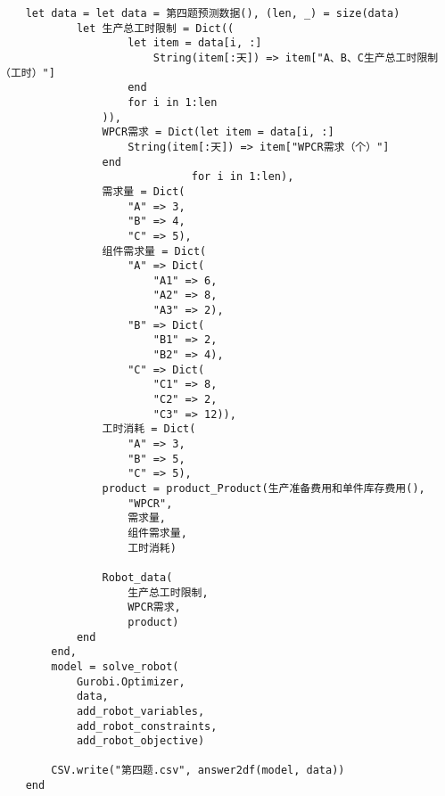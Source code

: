 \begin{appendices}
\begin{lstlisting}
    let data = let data = 第四题预测数据(), (len, _) = size(data)
            let 生产总工时限制 = Dict((
                    let item = data[i, :]
                        String(item[:天]) => item["A、B、C生产总工时限制（工时）"]
                    end
                    for i in 1:len
                )),
                WPCR需求 = Dict(let item = data[i, :]
                    String(item[:天]) => item["WPCR需求（个）"]
                end
                              for i in 1:len),
                需求量 = Dict(
                    "A" => 3,
                    "B" => 4,
                    "C" => 5),
                组件需求量 = Dict(
                    "A" => Dict(
                        "A1" => 6,
                        "A2" => 8,
                        "A3" => 2),
                    "B" => Dict(
                        "B1" => 2,
                        "B2" => 4),
                    "C" => Dict(
                        "C1" => 8,
                        "C2" => 2,
                        "C3" => 12)),
                工时消耗 = Dict(
                    "A" => 3,
                    "B" => 5,
                    "C" => 5),
                product = product_Product(生产准备费用和单件库存费用(),
                    "WPCR",
                    需求量,
                    组件需求量,
                    工时消耗)

                Robot_data(
                    生产总工时限制,
                    WPCR需求,
                    product)
            end
        end,
        model = solve_robot(
            Gurobi.Optimizer,
            data,
            add_robot_variables,
            add_robot_constraints,
            add_robot_objective)

        CSV.write("第四题.csv", answer2df(model, data))
    end
\end{lstlisting}
\end{appendices}